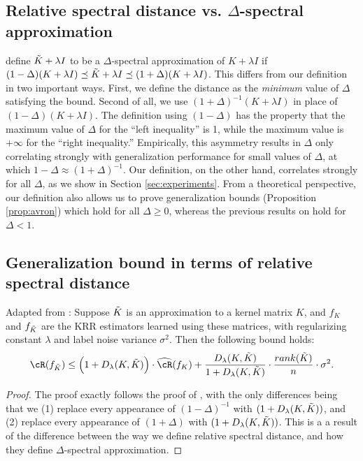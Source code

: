 \subsection{Relative spectral distance vs. $\Delta$-spectral approximation}
\citet{avron17} define $\tilde{K}+\lambda I$ to be a $\Delta$-spectral approximation of $K+\lambda I$ if $(1-\Delta)(K+\lambda I) \preceq \tilde{K} + \lambda I \preceq (1+\Delta)(K+\lambda I)$. This differs from our definition in two important ways. First, we define the distance as the \textit{minimum} value of $\Delta$ satisfying the bound.  Second of all, we use $(1+\Delta)^{-1}(K+\lambda I)$ in place of $(1-\Delta)(K+\lambda I)$. The definition using $(1-\Delta)$ has the property that the maximum value of $\Delta$ for the ``left inequality'' is 1, while the maximum value is $+\infty$ for the ``right inequality.'' Empirically, this asymmetry results in $\Delta$ only correlating strongly with generalization performance for small values of $\Delta$, at which $1-\Delta\approx (1+\Delta)^{-1}$. Our definition, on the other hand, correlates strongly for all $\Delta$, as we show in Section \ref{sec:experiments}.  From a theoretical perspective, our definition also allows us to prove generalization bounds (Proposition \ref{prop:avron}) which hold for all $\Delta \geq 0$, whereas the previous results on hold for $\Delta < 1$.


\subsection{Generalization bound in terms of relative spectral distance}
\begin{proposition}{Adapted from \citep{avron17}:}
	Suppose $\tilde{K}$ is an approximation to a kernel matrix $K$, and $f_{K}$ and $f_{\tilde{K}}$ are the KRR estimators learned using these matrices, with regularizing constant $\lambda$ and label noise variance $\sigma^2$. Then the following bound holds:
	\begin{eqnarray}
	\cR(f_{\tK}) \leq \Big(1+D_{\lambda}(K,\tK)\Big)\cdot \hcR(f_K) + \frac{D_{\lambda}(K,\tK)}{1+D_{\lambda}(K,\tK)}\cdot \frac{rank(\tK)}{n}\cdot\sigma^2.
	\end{eqnarray}
\end{proposition}
\begin{proof}
	The proof exactly follows the proof of \citep{avron17}, with the only differences being that we (1) replace every appearance of $(1-\Delta)^{-1}$ with $(1+D_{\lambda}(K,\tilde{K}))$, and (2) replace every appearance of $(1+\Delta)$ with $(1+D_{\lambda}(K,\tilde{K}))$.  This is a a result of the difference between the way we define relative spectral distance, and how they define $\Delta$-spectral approximation.
\end{proof}
